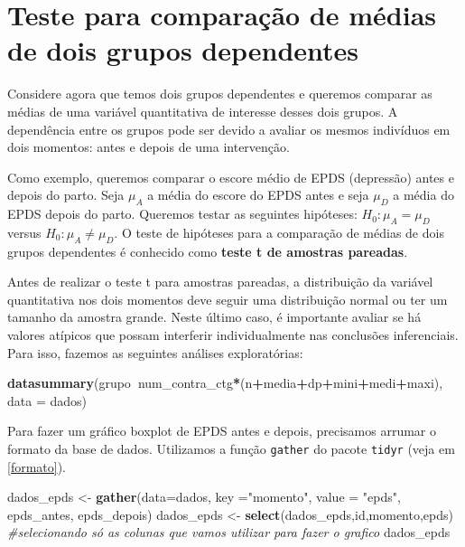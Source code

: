 \documentclass[
]{book}
\newenvironment{Shaded}{\begin{snugshade}}{\end{snugshade}}
\newcommand{\CommentTok}[1]{\textcolor[rgb]{0.56,0.35,0.01}{\textit{#1}}}
\newcommand{\DataTypeTok}[1]{\textcolor[rgb]{0.13,0.29,0.53}{#1}}
\newcommand{\KeywordTok}[1]{\textcolor[rgb]{0.13,0.29,0.53}{\textbf{#1}}}
\newcommand{\NormalTok}[1]{#1}
\newcommand{\OperatorTok}[1]{\textcolor[rgb]{0.81,0.36,0.00}{\textbf{#1}}}
\newcommand{\StringTok}[1]{\textcolor[rgb]{0.31,0.60,0.02}{#1}}
\begin{document}
\hypertarget{teste-para-comparauxe7uxe3o-de-muxe9dias-de-dois-grupos-dependentes}{%
\section{Teste para comparação de médias de dois grupos dependentes}\label{teste-para-comparauxe7uxe3o-de-muxe9dias-de-dois-grupos-dependentes}}

Considere agora que temos dois grupos dependentes e queremos comparar as médias de uma variável quantitativa de interesse desses dois grupos. A dependência entre os grupos pode ser devido a avaliar os mesmos indivíduos em dois momentos: antes e depois de uma intervenção.

Como exemplo, queremos comparar o escore médio de EPDS (depressão) antes e depois do parto. Seja \(\mu_A\) a média do escore do EPDS antes e seja \(\mu_D\) a média do EPDS depois do parto. Queremos testar as seguintes hipóteses: \(H_0: \mu_A=\mu_D\) versus \(H_0: \mu_A \neq \mu_D\). O teste de hipóteses para a comparação de médias de dois grupos dependentes é conhecido como \textbf{teste t de amostras pareadas}.

Antes de realizar o teste t para amostras pareadas, a distribuição da variável quantitativa nos dois momentos deve seguir uma distribuição normal ou ter um tamanho da amostra grande. Neste último caso, é importante avaliar se há valores atípicos que possam interferir individualmente nas conclusões inferenciais. Para isso, fazemos as seguintes análises exploratórias:

\begin{Shaded}
\begin{Highlighting}[]
\KeywordTok{datasummary}\NormalTok{(grupo}\OperatorTok{~}\NormalTok{num_contra_ctg}\OperatorTok{*}\NormalTok{(n}\OperatorTok{+}\NormalTok{media}\OperatorTok{+}\NormalTok{dp}\OperatorTok{+}\NormalTok{mini}\OperatorTok{+}\NormalTok{medi}\OperatorTok{+}\NormalTok{maxi), }\DataTypeTok{data =}\NormalTok{ dados)}
\end{Highlighting}
\end{Shaded}

Para fazer um gráfico boxplot de EPDS antes e depois, precisamos arrumar o formato da base de dados. Utilizamos a função \texttt{gather} do pacote \texttt{tidyr} (veja em \ref{formato}).

\begin{Shaded}
\begin{Highlighting}[]
\NormalTok{dados_epds <-}\StringTok{  }\KeywordTok{gather}\NormalTok{(}\DataTypeTok{data=}\NormalTok{dados, }\DataTypeTok{key =}\StringTok{"momento"}\NormalTok{, }\DataTypeTok{value =} \StringTok{"epds"}\NormalTok{,}
\NormalTok{                      epds_antes, epds_depois)}
\NormalTok{dados_epds <-}\StringTok{ }\KeywordTok{select}\NormalTok{(dados_epds,id,momento,epds) }
\CommentTok{#selecionando só as colunas que vamos utilizar para fazer o grafico}
\NormalTok{dados_epds}
\end{Highlighting}
\end{Shaded}
\end{document}
